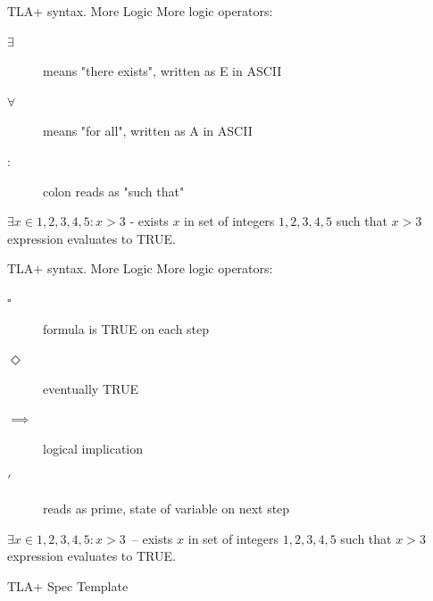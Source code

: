 \documentclass[12pt]{beamer}
\begin{document}
  \begin{frame}{TLA+ syntax. More Logic}
      More logic operators:
      \begin{description}
        \item[$\exists$] means "there exists", written as E in ASCII
        \item[$\forall$]  means "for all", written as A in ASCII
        \item[$:$] colon reads as "such that"
      \end{description}
      $\exists x \in {1,2,3,4,5} : x > 3$ - exists $x$ in
      set of integers ${1,2,3,4,5}$ such that $x > 3$ expression evaluates
      to TRUE.
  \end{frame}
  \begin{frame}{TLA+ syntax. More Logic}
      More logic operators:
      \begin{description}
        \item[$\square$] formula is TRUE on each step
        \item[$\Diamond$] eventually TRUE
        \item[$\implies$] logical implication
        \item[$'$] reads as prime, state of variable on next step

      \end{description}
      $\exists x \in {1,2,3,4,5} : x > 3$~-- exists $x$ in
      set of integers ${1,2,3,4,5}$ such that $x > 3$ expression evaluates to TRUE.
  \end{frame}
  \begin{frame}{TLA+ Spec Template}
      \begin{center}
          \inputminted[linenos, fontsize=\scriptsize]{tla}{figures/template.tla}
      \end{center}
  \end{frame}
\end{document}
